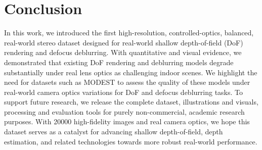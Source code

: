 \section{Conclusion}\label{sec:conclusion}


In this work, we introduced the first high-resolution, controlled-optics, balanced, real-world stereo dataset designed for real-world shallow depth-of-field (DoF) rendering and defocus deblurring. With quantitative and visual evidence, we demonstrated that existing DoF rendering and deblurring models degrade substantially under real lens optics as challenging indoor scenes. We highlight the need for datasets such as MODEST to assess the quality of these models under real-world camera optics variations for DoF and defocus deblurring tasks. To support future research, we release the complete dataset, illustrations and visuals, processing and evaluation tools for purely non-commercial, academic research purposes. With 20000 high-fidelity images and real camera optics, we hope this dataset serves as a catalyst for advancing shallow depth-of-field, depth estimation, and related technologies towards more robust real-world performance.
